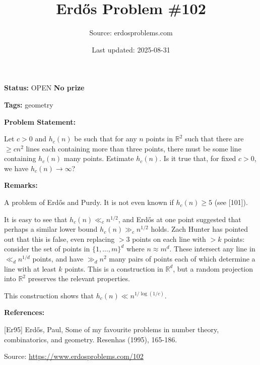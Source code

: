 \documentclass{article}
\title{Erd\H{o}s Problem \#102}
\date{Last updated: 2025-08-31}
\author{Source: erdosproblems.com}
\begin{document}
\maketitle

\noindent\textbf{Status:} OPEN \quad \textbf{No prize}

\noindent\textbf{Tags:} geometry

\medskip
\noindent\textbf{Problem Statement:}

Let $c>0$ and $h_c(n)$ be such that for any $n$ points in $\mathbb{R}^2$ such that there are $\geq cn^2$ lines each containing more than three points, there must be some line containing $h_c(n)$ many points. Estimate $h_c(n)$. Is it true that, for fixed $c>0$, we have $h_c(n)\to \infty$?

\bigskip
\noindent\textbf{Remarks:}

A problem of Erd\H{o}s and Purdy. It is not even known if $h_c(n)\geq 5$ (see [101]). 

It is easy to see that $h_c(n) \ll_c n^{1/2}$, and Erd\H{o}s at one point \cite{Er95} suggested that perhaps a similar lower bound $h_c(n)\gg_c n^{1/2}$ holds. Zach Hunter has pointed out that this is false, even replacing $>3$ points on each line with $>k$ points: consider the set of points in $\{1,\ldots,m\}^d$ where $n\approx m^d$. These intersect any line in $\ll_d n^{1/d}$ points, and have $\gg_d n^2$ many pairs of points each of which determine a line with at least $k$ points. This is a construction in $\mathbb{R}^d$, but a random projection into $\mathbb{R}^2$ preserves the relevant properties.

This construction shows that $h_c(n) \ll n^{1/\log(1/c)}$.

\bigskip
\noindent\textbf{References:}

[Er95] Erd\H{o}s, Paul, Some of my favourite problems in number theory, combinatorics, and geometry. Resenhas (1995), 165-186.

\bigskip
\noindent\small{Source: \url{https://www.erdosproblems.com/102}}
\end{document}
